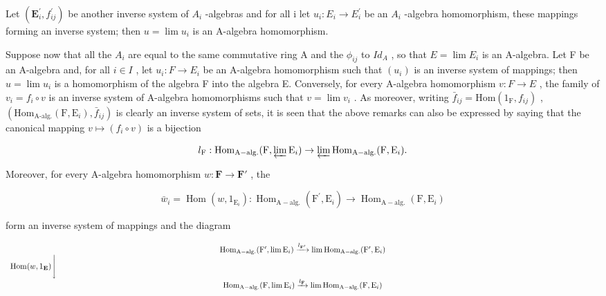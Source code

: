 Let \((\mathbf{E}_{i}^{\prime}, f_{ij}^{\prime})\) be another inverse system of \(A_{i}\) -algebras and for all i let \(u_{i}: E_{i} \to E_{i}^{\prime}\) be an \(A_{i}\) -algebra homomorphism, these mappings forming an inverse system; then \(u = \lim u_{i}\) is an A-algebra homomorphism.

Suppose now that all the \(A_{i}\) are equal to the same commutative ring A and the \(\phi_{ij}\) to \(Id_{A}\) , so that \(E = \lim E_{i}\) is an A-algebra. Let F be an A-algebra and, for all \(i \in I\) , let \(u_{i}: F \to E_{i}\) be an A-algebra homomorphism such that \((u_{i})\) is an inverse system of mappings; then \(u = \lim u_{i}\) is a homomorphism of the algebra F into the algebra E. Conversely, for every A-algebra homomorphism \(v: F \to E\) , the family of \(v_{i} = f_{i} \circ v\) is an inverse system of A-algebra homomorphisms such that \(v = \lim v_{i}\) . As moreover, writing \(\bar{f}_{ij} = \text{Hom}(1_{\text{F}}, f_{ij})\) , \((\text{Hom}_{\text{A-alg.}}(\text{F}, \text{E}_i), \bar{f}_{ij})\) is clearly an inverse system of sets, it is seen that the above remarks can also be expressed by saying that the canonical mapping \(v \mapsto (f_i \circ v)\) is a bijection

\[
l _ {\mathrm{F}}: \operatorname{Hom} _ {\mathrm{A-alg.}} (\mathrm{F}, \varprojlim \mathrm{E} _ {i}) \rightarrow \varprojlim \operatorname{Hom} _ {\mathrm{A-alg.}} (\mathrm{F}, \mathrm{E} _ {i}).
\]

Moreover, for every A-algebra homomorphism \(w: \mathbf{F} \to \mathbf{F}'\) , the

\[
\bar {w} _ {i} = \operatorname{Hom} (w, 1 _ {\mathrm{E} _ {i}}): \operatorname{Hom} _ {\mathrm{A-alg.}} (\mathrm{F} ^ {\prime}, \mathrm{E} _ {i}) \rightarrow \operatorname{Hom} _ {\mathrm{A-alg.}} (\mathrm{F}, \mathrm{E} _ {i})
\]

form an inverse system of mappings and the diagram

\[
\begin{array}{c} \operatorname{Hom} _ {\mathrm{A-alg.}} (\mathrm{F} ^ {\prime}, \lim \mathrm{E} _ {i}) \xrightarrow {l _ {\mathbf {F} ^ {\prime}}} \lim \operatorname{Hom} _ {\mathrm{A-alg.}} (\mathrm{F} ^ {\prime}, \mathrm{E} _ {i}) \\ \operatorname{Hom} (w, 1 _ {\mathbf {E}}) \Biggl \downarrow \qquad \qquad \qquad \qquad \qquad \qquad \qquad \qquad \qquad \qquad \qquad \qquad \qquad \qquad \qquad \qquad \qquad \qquad \qquad \qquad \qquad \qquad \qquad \qquad \qquad \qquad \qquad \qquad \qquad \qquad \qquad \qquad \qquad \qquad \\ \operatorname{Hom} _ {\mathrm{A-alg.}} (\mathrm{F}, \lim \mathrm{E} _ {i}) \xrightarrow {l _ {\mathbf {F}}} \lim \operatorname{Hom} _ {\mathrm{A-alg.}} (\mathrm{F}, \mathrm{E} _ {i}) \end{array}
\]

